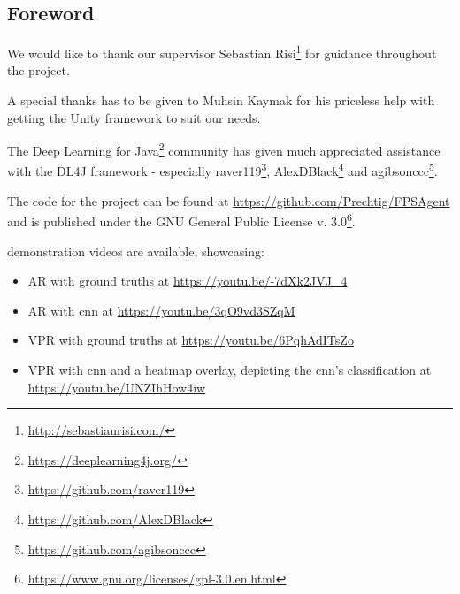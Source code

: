 
\begin{center}
\section*{Foreword}
\vspace{1em}
\end{center}


\noindent
We would like to thank our supervisor Sebastian Risi\footnote{\url{http://sebastianrisi.com/}} for guidance throughout the project.

A special thanks has to be given to Muhsin Kaymak for his priceless help with getting the Unity framework to suit our needs.

The Deep Learning for Java\footnote{\url{https://deeplearning4j.org/}} community has given much appreciated assistance with the DL4J framework - especially raver119\footnote{\url{https://github.com/raver119}}, AlexDBlack\footnote{\url{https://github.com/AlexDBlack}} and agibsonccc\footnote{\url{https://github.com/agibsonccc}}.

\vspace{5mm}

\noindent
The code for the project can be found at \url{https://github.com/Prechtig/FPSAgent} and is published under the GNU General Public License v. 3.0\footnote{\url{https://www.gnu.org/licenses/gpl-3.0.en.html}}.

\vspace{5mm}

 demonstration videos are available, showcasing:
\begin{itemize}
  \item AR with ground truths at \url{https://youtu.be/-7dXk2JVJ_4}
  \item AR with cnn at \url{https://youtu.be/3qO9vd3SZqM}
  \item VPR with ground truths at \url{https://youtu.be/6PqhAdITsZo}
  \item VPR with cnn and a heatmap overlay, depicting the cnn's classification at \url{https://youtu.be/UNZIhHow4iw} 
\end{itemize}

\restoregeometry









